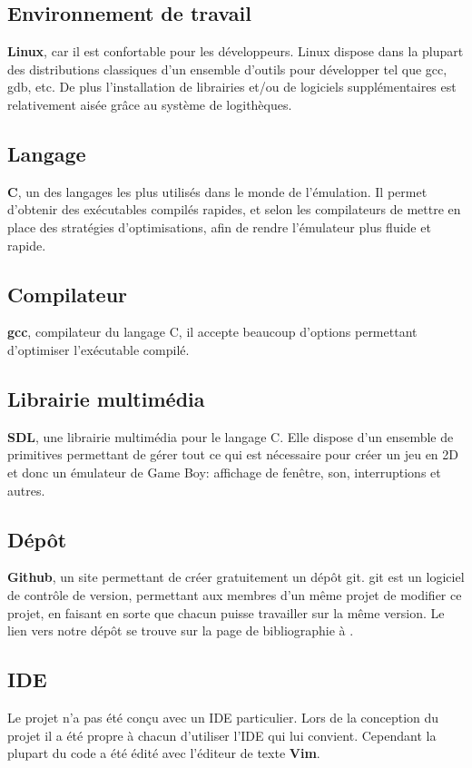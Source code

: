 \documentclass[french]{report}
\begin{document}
\subsection{Environnement de travail}
\textbf{Linux}, car il est confortable pour les développeurs. Linux dispose dans la plupart des distributions classiques d'un ensemble d'outils pour développer tel que gcc, gdb, etc. De plus l'installation de librairies et/ou de logiciels supplémentaires est relativement aisée grâce au système de logithèques.

\subsection{Langage}
\textbf{C}, un des langages les plus utilisés dans le monde de l'émulation. Il permet d'obtenir des exécutables compilés rapides, et selon les compilateurs de mettre en place des stratégies d'optimisations, afin de rendre l'émulateur plus fluide et rapide.

\subsection{Compilateur}
\textbf{gcc}, compilateur du langage C, il accepte beaucoup d'options permettant d'optimiser l'exécutable compilé.

\subsection{Librairie multimédia}
\textbf{SDL}, une librairie multimédia pour le langage C. Elle dispose d'un ensemble de primitives permettant de gérer tout ce qui est nécessaire pour créer un jeu en 2D et donc un émulateur de Game Boy: affichage de fenêtre, son, interruptions et autres.

\subsection{Dépôt}
\textbf{Github}, un site permettant de créer gratuitement un dépôt git. git est un logiciel de contrôle de version, permettant aux membres d'un même projet de modifier ce projet, en faisant en sorte que chacun puisse travailler sur la même version. Le lien vers notre dépôt se trouve sur la page de bibliographie à \cite{github}.

\subsection{IDE}
Le projet n'a pas été conçu avec un IDE particulier. Lors de la conception du projet il a été propre à chacun d'utiliser l'IDE qui lui convient. Cependant la plupart du code a été édité avec l'éditeur de texte \textbf{Vim}.
\end{document}
